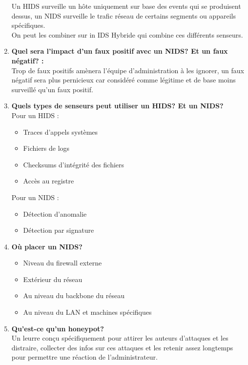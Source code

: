 \documentclass{report}
\begin{document}
\begin{enumerate}
					Un HIDS surveille un hôte uniquement sur base des events qui se produisent dessus, un NIDS surveille le trafic réseau de certains segments ou appareils spécifiques.\\
					On peut les combiner sur in IDS Hybride qui combine ces différents senseurs.\\

				\item \textbf{Quel sera l'impact d'un faux positif avec un NIDS? Et un faux négatif? : }\\

					Trop de faux positifs amènera l'équipe d'administration à les ignorer, un faux négatif sera plus pernicieux car considéré comme légitime et de base moins surveillé qu'un faux positif.\\

				\item \textbf{Quels types de senseurs peut utiliser un HIDS? Et un NIDS? }\\

					Pour un HIDS : \\
					\begin{itemize}
						\item Traces d'appels systèmes 
						\item Fichiers de logs
						\item Checksums d'intégrité des fichiers
						\item Accès au registre\\
					\end{itemize}

					Pour un NIDS : \\
					\begin{itemize}
						\item Détection d'anomalie
						\item Détection par signature
					\end{itemize}

				\item \textbf{Où placer un NIDS? }\\

					\begin{itemize}
						\item Niveau du firewall externe
						\item Extérieur du réseau
						\item Au niveau du backbone du réseau
						\item Au niveau du LAN et machines spécifiques
					\end{itemize}

				\item \textbf{Qu'est-ce qu'un honeypot? }\\

					Un leurre conçu spécifiquement pour attirer les auteurs d'attaques et les distraire, collecter des infos sur ces attaques et les retenir assez longtemps pour permettre une réaction de l'administrateur.
			\end{enumerate}
\end{document}
